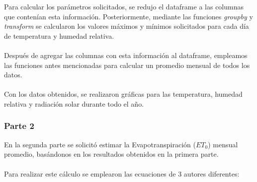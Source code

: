 \documentclass[letterpaper,12pt]{article}
\begin{document}
Para calcular los parámetros solicitados, se redujo el dataframe a las columnas que contenían esta información. Posteriormente, mediante las funciones \emph{groupby} y \emph{transform} se calcularon los valores máximos y mínimos solicitados para cada día de temperatura y humedad relativa.\\\\ 

Después de agregar las columnas con esta información al dataframe, empleamos las funciones antes mencionadas para calcular un promedio mensual de todos los datos.\\\\

Con los datos obtenidos, se realizaron gráficas para las temperatura, humedad relativa y radiación solar durante todo el año.

\subsubsection{Parte 2}
En la segunda parte se solicitó estimar la Evapotranspiración ($ET_{0}$) mensual promedio, basándonos en los resultados obtenidos en la primera parte.
\\\\
Para realizar este cálculo se emplearon las ecuaciones de 3 autores diferentes:
\end{document}
